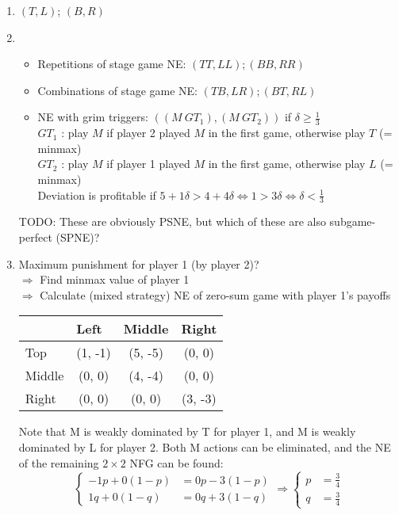 \documentclass[../main.tex]{subfiles}
\begin{document}
\begin{solution}
\begin{enumerate}
\item $(T,L)$; $(B,R)$

\item
\begin{itemize}
\item Repetitions of stage game NE: $(TT,LL); (BB,RR)$
\item Combinations of stage game NE: $(TB,LR); (BT,RL)$
\item NE with grim triggers: $((M ~ GT_1), (M ~ GT_2))$ if $\delta \geq \frac{1}{3}$ \\
	$GT_1$ : play $M$ if player 2 played $M$ in the first game, otherwise play $T$ (= minmax) \\
	$GT_2$ : play $M$ if player 1 played $M$ in the first game, otherwise play $L$ (= minmax) \\		
	Deviation is profitable if
	$5 + 1 \delta > 4 + 4 \delta \Leftrightarrow 1 > 3 \delta \Leftrightarrow \delta < \frac{1}{3}$
\end{itemize}
TODO: These are obviously PSNE, but which of these are also subgame-perfect (SPNE)?

\item
Maximum punishment for player 1 (by player 2)? \\
$\Rightarrow$ Find minmax value of player 1 \\
$\Rightarrow$ Calculate (mixed strategy) NE of zero-sum game with player 1's payoffs
\begin{table}[h]
\centering
\begin{tabular}{lccc}
                            & \multicolumn{1}{l}{Left} & \multicolumn{1}{l}{Middle} & \multicolumn{1}{l}{Right} \\ \hline
\multicolumn{1}{l|}{Top}    & (1, -1)                  & (5, -5)                    & (0, 0)                    \\
\multicolumn{1}{l|}{Middle} & (0, 0)                   & (4, -4)                    & (0, 0)                    \\
\multicolumn{1}{l|}{Right}  & (0, 0)                   & (0, 0)                     & (3, -3)                   
\end{tabular}
\end{table}

Note that M is weakly dominated by T for player 1, and M is weakly dominated by L for player 2. Both M actions can be eliminated, and the NE of the remaining $2 \times 2$ NFG can be found:
\[
\begin{cases}
-1 p + 0 (1-p) &= 0 p - 3 (1-p) \\
1 q + 0 (1-q)  &= 0 q + 3 (1-q)
\end{cases}
\Rightarrow
\begin{cases}
p  &= \frac{3}{4} \\
q  &= \frac{3}{4}
\end{cases}
\]
	

\end{enumerate}
\end{solution}
\end{document}
